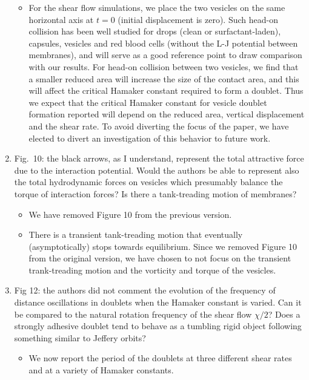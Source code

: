 \documentclass[11pt]{article}
\newcommand{\comment}[1]{{\color{blue} #1}}
\begin{document}
\begin{enumerate}
\begin{itemize}
  \item For the shear flow simulations, we place the two vesicles on the same horizontal axis at $t=0$ (initial displacement is zero).
  Such head-on collision has been well studied for drops (clean or surfactant-laden), capsules, vesicles and red blood cells (without the L-J potential between membranes),
  and will serve as a good reference point to draw comparison with our results. For head-on collision between two vesicles,
  we find that  a smaller reduced area will increase the
    size of the contact area, and this will affect the critical
    Hamaker constant required to form a doublet. Thus we expect that the critical Hamaker constant for vesicle doublet formation reported will depend on the
    reduced area, vertical displacement and the shear rate. 
    To avoid
    diverting the focus of the paper, we have elected to divert an
    investigation of this behavior to future work.
\end{itemize}

\item\comment{Fig.~10: the black arrows, as I understand, represent the total
attractive force due to the interaction potential. Would the authors
be able to represent also the total hydrodynamic forces on vesicles
which presumably balance the torque of interaction forces? Is there a
tank-treading motion of membranes?}
\begin{itemize}
  \item We have removed Figure 10 from the previous version.

  \item There is a transient tank-treading motion that eventually (asymptotically) stops towards equilibrium. 
  Since we removed Figure 10 from the original version, we have chosen to
    not focus on the transient trank-treading motion and the vorticity and torque of the vesicles.
\end{itemize}

\item\comment{Fig 12: the authors did not comment the evolution of the
frequency of distance oscillations in doublets when the Hamaker constant
is varied. Can it be compared to the natural rotation frequency of the
shear flow $\chi/2$? Does a strongly adhesive doublet tend to behave as
a tumbling rigid object following something similar to Jeffery orbits?}
\begin{itemize}
  \item We now report the period of the doublets at three different
    shear rates and at a variety of Hamaker constants.


\end{itemize}
\end{enumerate}
\end{document}
